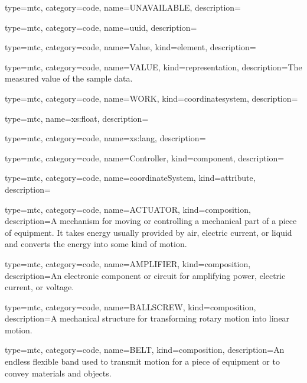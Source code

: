 {
  type=mtc,
  category=code,
  name={UNAVAILABLE},
  description={}
}


{
  type=mtc,
  category=code,
  name={uuid},
  description={}
}



{
  type=mtc,
  category=code,
  name={Value},
  kind={element},
  description={}
}


{
  type=mtc,
  category=code,
  name={VALUE},
  kind={representation},
  description={The measured value of the sample data.}
}


{
  type=mtc,
  category=code,
  name={WORK},
  kind={coordinatesystem},
  description={}
}


{
  type=mtc,
  name={xs:float},
  description={}
}


{
  type=mtc,
  category=code,
  name={xs:lang},
  description={}
}


{
  type=mtc,
  category=code,
  name={Controller},
  kind={component},
  description= {}
}


{
  type=mtc,
  category=code,
  name={coordinateSystem},
  kind={attribute},
  description={}
}


{
  type=mtc,
  category=code,
  name={ACTUATOR},
  kind={composition},
  description={A mechanism for moving or controlling a mechanical part of a piece of equipment.   \newline It takes energy usually provided by air, electric current, or liquid and converts the energy into some kind of motion.  }
}


{
  type=mtc,
  category=code,
  name={AMPLIFIER},
  kind={composition},
  description={An electronic component or circuit for amplifying power, electric current, or voltage.}
}


{
  type=mtc,
  category=code,
  name={BALLSCREW},
  kind={composition},
  description={A mechanical structure for transforming rotary motion into linear motion.}
}


{
  type=mtc,
  category=code,
  name={BELT},
  kind={composition},
  description={An endless flexible band used to transmit motion for a piece of equipment or to convey materials and objects.}
}


